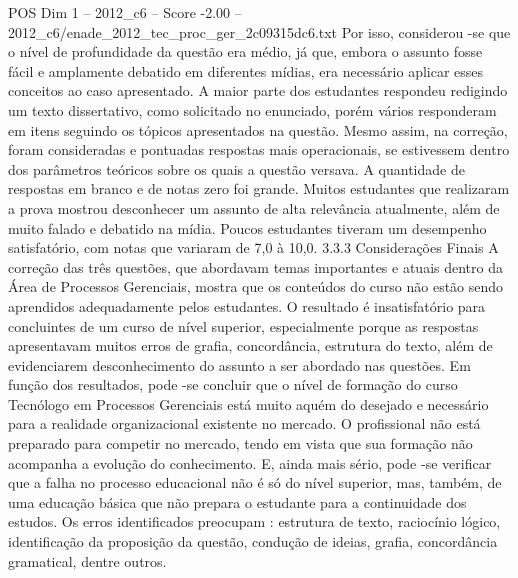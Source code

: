 \begin{textsample}{POS Dim 1 – 2012\_c6 – Score -2.00 – 2012\_c6/enade\_2012\_tec\_proc\_ger\_2c09315dc6.txt}
Por isso, considerou -se que o nível de profundidade da questão era médio, já que, embora o assunto fosse fácil e amplamente debatido em diferentes mídias, era necessário aplicar esses conceitos ao caso apresentado.
A maior parte dos estudantes respondeu redigindo um texto dissertativo, como solicitado no enunciado, porém vários responderam em itens seguindo os tópicos apresentados na questão.
Mesmo assim, na correção, foram consideradas e pontuadas respostas mais operacionais, se estivessem dentro dos parâmetros teóricos sobre os quais a questão versava.
A quantidade de respostas em branco e de notas zero foi grande.
Muitos estudantes que realizaram a prova mostrou desconhecer um assunto de alta relevância atualmente, além de muito falado e debatido na mídia.
Poucos estudantes tiveram um desempenho satisfatório, com notas que variaram de 7,0 à 10,0. 3.3.3 Considerações Finais A correção das três questões, que abordavam temas importantes e atuais dentro da Área de Processos Gerenciais, mostra que os conteúdos do curso não estão sendo aprendidos adequadamente pelos estudantes.
O resultado é insatisfatório para concluintes de um curso de nível superior, especialmente porque as respostas apresentavam muitos erros de grafia, concordância, estrutura do texto, além de evidenciarem desconhecimento do assunto a ser abordado nas questões.
Em função dos resultados, pode -se concluir que o nível de formação do curso Tecnólogo em Processos Gerenciais está muito aquém do desejado e necessário para a realidade organizacional existente no mercado.
O profissional não está preparado para competir no mercado, tendo em vista que sua formação não acompanha a evolução do conhecimento.
E, ainda mais sério, pode -se verificar que a falha no processo educacional não é só do nível superior, mas, também, de uma educação básica que não prepara o estudante para a continuidade dos estudos.
Os erros identificados preocupam : estrutura de texto, raciocínio lógico, identificação da proposição da questão, condução de ideias, grafia, concordância gramatical, dentre outros.

\end{textsample}

